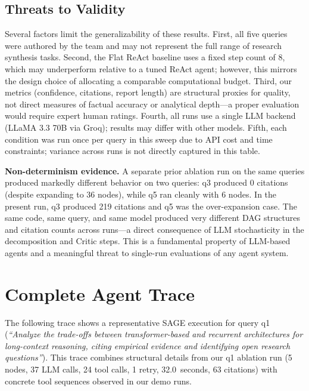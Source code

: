 \documentclass[11pt]{article}
\begin{document}
\subsection{Threats to Validity}

Several factors limit the generalizability of these results. First, all five queries were authored by the team and may not represent the full range of research synthesis tasks. Second, the Flat ReAct baseline uses a fixed step count of 8, which may underperform relative to a tuned ReAct agent; however, this mirrors the design choice of allocating a comparable computational budget. Third, our metrics (confidence, citations, report length) are structural proxies for quality, not direct measures of factual accuracy or analytical depth---a proper evaluation would require expert human ratings. Fourth, all runs use a single LLM backend (LLaMA 3.3 70B via Groq); results may differ with other models. Fifth, each condition was run once per query in this sweep due to API cost and time constraints; variance across runs is not directly captured in this table.

\textbf{Non-determinism evidence.} A separate prior ablation run on the same queries produced markedly different behavior on two queries: q3 produced 0 citations (despite expanding to 36 nodes), while q5 ran cleanly with 6 nodes. In the present run, q3 produced 219 citations and q5 was the over-expansion case. The same code, same query, and same model produced very different DAG structures and citation counts across runs---a direct consequence of LLM stochasticity in the decomposition and Critic steps. This is a fundamental property of LLM-based agents and a meaningful threat to single-run evaluations of any agent system.

\section{Complete Agent Trace}

The following trace shows a representative SAGE execution for query q1 (\textit{``Analyze the trade-offs between transformer-based and recurrent architectures for long-context reasoning, citing empirical evidence and identifying open research questions''}). This trace combines structural details from our q1 ablation run (5 nodes, 37 LLM calls, 24 tool calls, 1 retry, 32.0~seconds, 63 citations) with concrete tool sequences observed in our demo runs.
\end{document}
